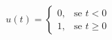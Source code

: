 \documentclass[preview]{standalone}
\begin{document}
\begin{align*}
u(t) = \begin{cases} 0, & \text{se } t < 0 \\ 1, & \text{se } t \geq 0 \end{cases}
\end{align*}
\end{document}
